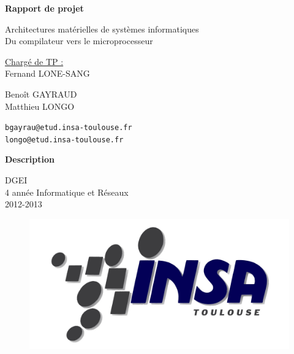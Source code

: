 \documentclass[a4paper]{report}
\begin{document}
\begin{titlepage}

\centering

{\Large {\bf Rapport de projet}}\\

\vspace{30pt}

{\huge Architectures matérielles de systèmes informatiques}\\
\vspace{50pt}
{\Huge Du compilateur vers le microprocesseur}\\

\vspace{130pt}

\underline{Chargé de TP :} \\
\vspace{5pt}
Fernand LONE-SANG

\vspace{30pt}
Benoît GAYRAUD\\
Matthieu LONGO

\vspace{5pt}

\par
{\tt bgayrau@etud.insa-toulouse.fr}\\
{\tt longo@etud.insa-toulouse.fr}\\

\vspace{20pt}

\vfill {\bf Description}\medskip \\

\vspace{50px}


\begin{center}
DGEI\\
4 année  Informatique et Réseaux\\
2012-2013
\end{center}
\begin{figure}[!h]
    \centering
    \includegraphics[scale=0.45]{logoINSA.jpg}
\end{figure}



\end{titlepage}
\end{document}
